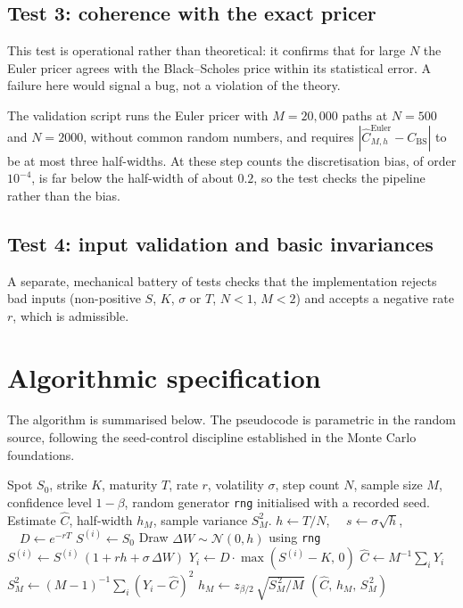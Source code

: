 \documentclass[11pt,a4paper]{article}
\theoremstyle{plain}
\theoremstyle{definition}
\theoremstyle{remark}
\begin{document}
\subsection{Test 3: coherence with the exact pricer}

This test is operational rather than theoretical: it confirms that for
large $N$ the Euler pricer agrees with the Black--Scholes price within
its statistical error. A failure here would signal a bug, not a
violation of the theory.

The validation script runs the Euler pricer with $M = 20{,}000$ paths
at $N = 500$ and $N = 2000$, without common random numbers, and
requires $|\hat C_{M, h}^{\mathrm{Euler}} - C_{\mathrm{BS}}|$ to be at
most three half-widths. At these step counts the discretisation bias,
of order $10^{-4}$, is far below the half-width of about $0.2$, so the
test checks the pipeline rather than the bias.

\subsection{Test 4: input validation and basic invariances}

A separate, mechanical battery of tests checks that the implementation
rejects bad inputs (non-positive $S$, $K$, $\sigma$ or $T$, $N < 1$,
$M < 2$) and accepts a negative rate $r$, which is admissible.

\section{Algorithmic specification}
\label{sec:algorithm}

The algorithm is summarised below. The pseudocode is parametric in
the random source, following the seed-control discipline established
in the Monte Carlo foundations.

\begin{algorithm}[H]
\caption{Euler--Maruyama Monte Carlo for the European call (GBM)}
\label{alg:mc-euler}
\begin{algorithmic}[1]
\Require Spot $S_0$, strike $K$, maturity $T$, rate $r$, volatility
$\sigma$, step count $N$, sample size $M$, confidence level
$1 - \beta$, random generator \texttt{rng} initialised with a recorded
seed.
\Ensure Estimate $\hat C$, half-width $h_M$, sample variance $S_M^2$.
\State $h \gets T / N$,
$\quad s \gets \sigma \sqrt{h}$,
$\quad D \gets e^{-rT}$
\State $S^{(i)} \gets S_0$
\State Draw $\Delta W \sim \mathcal{N}(0, h)$ using \texttt{rng}
\State $S^{(i)} \gets S^{(i)}\,(1 + r h + \sigma\, \Delta W)$
\EndFor
\State $Y_i \gets D \cdot \max(S^{(i)} - K,\, 0)$
\EndFor
\State $\hat C \gets M^{-1} \sum_i Y_i$
\State $S_M^2 \gets (M-1)^{-1} \sum_i (Y_i - \hat C)^2$
\State $h_M \gets z_{\beta/2}\, \sqrt{S_M^{\,2}/M}$
\State \Return $(\hat C,\, h_M,\, S_M^{\,2})$
\end{algorithmic}
\end{algorithm}
\end{document}
